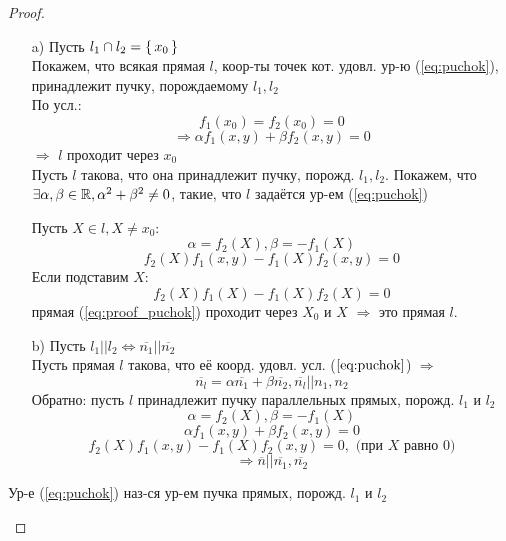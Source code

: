 \begin{proof}
  \begin{itemize}
    \item [a) ] Пусть $l_1 \cap l_2 = \set{x_0}$ \\

      Покажем, что всякая прямая $l$, коор-ты точек кот. удовл. ур-ю (\ref{eq:puchok}), принадлежит пучку, порождаемому $l_1, l_2$ \\

      По усл.:
      \[
      f_1(x_0) = f_2(x_0) = 0
      \]
      \[
      \Rightarrow \alpha f_1(x, y) + \beta f_2(x, y) = 0 
      \] 
      $\Rightarrow$ $l$ проходит через $x_0$ \\

      Пусть $l$ такова, что она принадлежит пучку, порожд. $l_1, l_2$. Покажем, что $\exists \alpha, \beta \in \mathbb{R}, \alpha^{2} + \beta^{2} \neq 0$, такие, что $l$ задаётся ур-ем (\ref{eq:puchok})

      Пусть $X \in l, X \neq x_0$:
      \[
      \alpha = f_2(X), \beta = -f_1(X)
      \]
      \begin{equation}
      f_2(X)f_1(x, y) - f_1(X)f_2(x, y) = 0
      \label{eq:proof_puchok}
      \end{equation}
      Если подставим $X$:
      \[
      f_2(X) f_1(X) - f_1(X) f_2(X) = 0
      \]
      прямая (\ref{eq:proof_puchok}) проходит через $X_0$ и $X$ $\Rightarrow$ это прямая $l$.
    \item [b) ] Пусть $l_1 || l_2 \iff \overline{n_1} || \overline{n_2}$ \\

      Пусть прямая $l$ такова, что её коорд. удовл. усл. ($\ref{eq:puchok}$) $\Rightarrow$
      \[
      \overline{n_l} = \alpha\overline{n_1} + \beta\overline{n_2}, \overline{n_l} || n_1, n_2
      \]
      Обратно: пусть $l$ принадлежит пучку параллельных прямых, порожд. $l_1$ и $l_2$ \\
      
      \[
      \alpha = f_2(X), \beta = -f_1(X)
      \]
      \[
      \alpha f_1(x, y) + \beta f_2(x, y) = 0
      \]
      \[
      f_2(X) f_1(x, y) - f_1(X) f_2(x, y) = 0, \text{ (при $X$ равно 0)}
      \]
      \[
      \Rightarrow \overline{n} || \overline{n_1}, \overline{n_2}
      \]
  \end{itemize}
  \begin{definition}
  Ур-е (\ref{eq:puchok}) наз-ся ур-ем пучка прямых, порожд. $l_1$ и $l_2$
  \end{definition}
\end{proof}

